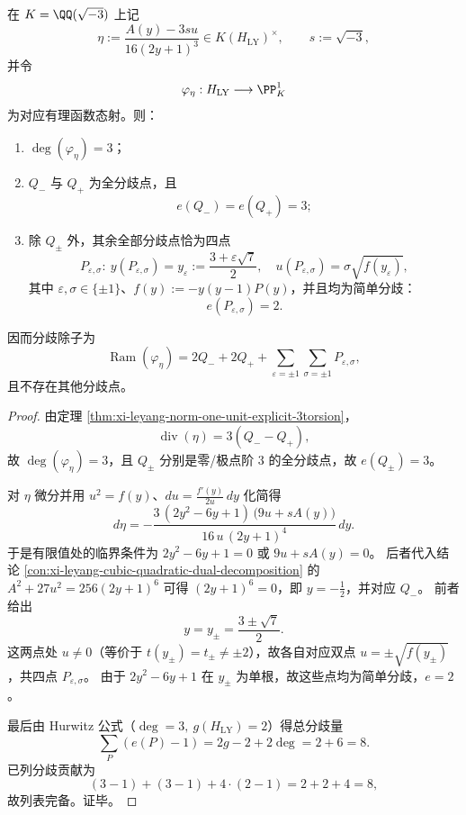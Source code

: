 \begin{theorem}\label{thm:xi-leyang-eta-degree3-complete-ramification}
在 \(K=\QQ(\sqrt{-3})\) 上记
\[
\eta:=\frac{A(y)-3su}{16(2y+1)^3}\in K(H_{\mathrm{LY}})^\times,\qquad s:=\sqrt{-3},
\]
并令
\[
\varphi_\eta:H_{\mathrm{LY}}\longrightarrow \PP^1_K
\]
为对应有理函数态射。则：
\begin{enumerate}
  \item \(\deg(\varphi_\eta)=3\)；
  \item \(Q_-\) 与 \(Q_+\) 为全分歧点，且
  \[
  e(Q_-)=e(Q_+)=3;
  \]
  \item 除 \(Q_\pm\) 外，其余全部分歧点恰为四点
  \[
  P_{\varepsilon,\sigma}:\ 
  y(P_{\varepsilon,\sigma})=y_\varepsilon:=\frac{3+\varepsilon\sqrt7}{2},\quad
  u(P_{\varepsilon,\sigma})=\sigma\sqrt{f(y_\varepsilon)},
  \]
  其中 \(\varepsilon,\sigma\in\{\pm1\}\)、\(f(y):=-y(y-1)P(y)\)，并且均为简单分歧：
  \[
  e(P_{\varepsilon,\sigma})=2.
  \]
\end{enumerate}
因而分歧除子为
\[
\operatorname{Ram}(\varphi_\eta)
=2Q_-+2Q_++\sum_{\varepsilon=\pm1}\sum_{\sigma=\pm1}P_{\varepsilon,\sigma},
\]
且不存在其他分歧点。
\end{theorem}
\begin{proof}
由定理 \ref{thm:xi-leyang-norm-one-unit-explicit-3torsion}，
\[
\operatorname{div}(\eta)=3(Q_--Q_+),
\]
故 \(\deg(\varphi_\eta)=3\)，且 \(Q_\pm\) 分别是零/极点阶 \(3\) 的全分歧点，故 \(e(Q_\pm)=3\)。

对 \(\eta\) 微分并用 \(u^2=f(y)\)、\(du=\frac{f'(y)}{2u}\,dy\) 化简得
\[
d\eta
=-\frac{3\,(2y^2-6y+1)\,\bigl(9u+sA(y)\bigr)}{16\,u\,(2y+1)^4}\,dy.
\]
于是有限值处的临界条件为
\(
2y^2-6y+1=0
\)
或
\(
9u+sA(y)=0
\)。
后者代入结论 \ref{con:xi-leyang-cubic-quadratic-dual-decomposition} 的
\(
A^2+27u^2=256(2y+1)^6
\)
可得 \((2y+1)^6=0\)，即 \(y=-\frac12\)，并对应 \(Q_-\)。
前者给出
\[
y=y_\pm=\frac{3\pm\sqrt7}{2}.
\]
这两点处 \(u\neq 0\)（等价于 \(t(y_\pm)=t_\pm\neq\pm2\)），故各自对应双点
\(
u=\pm\sqrt{f(y_\pm)}
\)，共四点 \(P_{\varepsilon,\sigma}\)。
由于 \(2y^2-6y+1\) 在 \(y_\pm\) 为单根，故这些点均为简单分歧，\(e=2\)。

最后由 Hurwitz 公式（\(\deg=3,\ g(H_{\mathrm{LY}})=2\)）得总分歧量
\[
\sum_{P}(e(P)-1)=2g-2+2\deg=2+6=8.
\]
已列分歧贡献为
\[
(3-1)+(3-1)+4\cdot(2-1)=2+2+4=8,
\]
故列表完备。证毕。
\end{proof}

